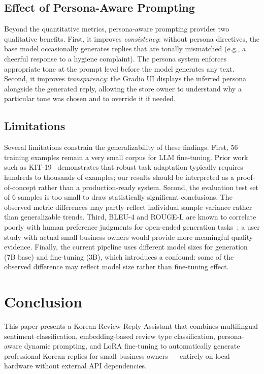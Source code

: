 \documentclass[conference]{IEEEtran}
\begin{document}
\subsection{Effect of Persona-Aware Prompting}

Beyond the quantitative metrics, persona-aware prompting provides two
qualitative benefits.
First, it improves \textit{consistency}: without persona directives,
the base model occasionally generates replies that are tonally
mismatched (e.g., a cheerful response to a hygiene complaint).
The persona system enforces appropriate tone at the prompt level before
the model generates any text.
Second, it improves \textit{transparency}: the Gradio UI displays the
inferred persona alongside the generated reply, allowing the store
owner to understand why a particular tone was chosen and to override
it if needed.

\subsection{Limitations}

Several limitations constrain the generalizability of these findings.
First, 56 training examples remain a very small corpus for LLM
fine-tuning.
Prior work such as KIT-19~\cite{kit19_2024} demonstrates that robust
task adaptation typically requires hundreds to thousands of examples;
our results should be interpreted as a proof-of-concept rather than
a production-ready system.
Second, the evaluation test set of 6 samples is too small to draw
statistically significant conclusions.
The observed metric differences may partly reflect individual sample
variance rather than generalizable trends.
Third, BLEU-4 and ROUGE-L are known to correlate poorly with human
preference judgments for open-ended generation tasks~\cite{bertscore2020};
a user study with actual small business owners would provide more
meaningful quality evidence.
Finally, the current pipeline uses different model sizes for generation
(7B base) and fine-tuning (3B), which introduces a confound: some
of the observed difference may reflect model size rather than
fine-tuning effect.

\section{Conclusion}

This paper presents a Korean Review Reply Assistant that combines
multilingual sentiment classification, embedding-based review type
classification, persona-aware dynamic prompting, and LoRA fine-tuning
to automatically generate professional Korean replies for small business
owners — entirely on local hardware without external API dependencies.
\end{document}
